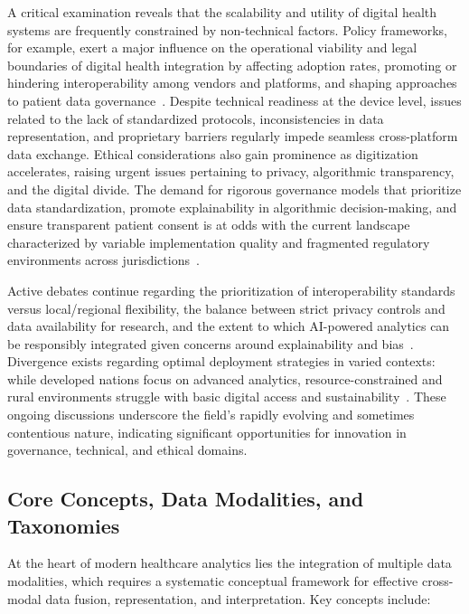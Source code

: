 \documentclass[sigconf]{acmart}
\begin{document}
A critical examination reveals that the scalability and utility of digital health systems are frequently constrained by non-technical factors. Policy frameworks, for example, exert a major influence on the operational viability and legal boundaries of digital health integration by affecting adoption rates, promoting or hindering interoperability among vendors and platforms, and shaping approaches to patient data governance~\cite{ref82,ref90}. Despite technical readiness at the device level, issues related to the lack of standardized protocols, inconsistencies in data representation, and proprietary barriers regularly impede seamless cross-platform data exchange. Ethical considerations also gain prominence as digitization accelerates, raising urgent issues pertaining to privacy, algorithmic transparency, and the digital divide. The demand for rigorous governance models that prioritize data standardization, promote explainability in algorithmic decision-making, and ensure transparent patient consent is at odds with the current landscape characterized by variable implementation quality and fragmented regulatory environments across jurisdictions~\cite{ref82,ref84,ref90,ref106}.

Active debates continue regarding the prioritization of interoperability standards versus local/regional flexibility, the balance between strict privacy controls and data availability for research, and the extent to which AI-powered analytics can be responsibly integrated given concerns around explainability and bias~\cite{ref90}. Divergence exists regarding optimal deployment strategies in varied contexts: while developed nations focus on advanced analytics, resource-constrained and rural environments struggle with basic digital access and sustainability~\cite{ref82,ref84}. These ongoing discussions underscore the field's rapidly evolving and sometimes contentious nature, indicating significant opportunities for innovation in governance, technical, and ethical domains.

\subsection{Core Concepts, Data Modalities, and Taxonomies}

At the heart of modern healthcare analytics lies the integration of multiple data modalities, which requires a systematic conceptual framework for effective cross-modal data fusion, representation, and interpretation. Key concepts include:
\end{document}
